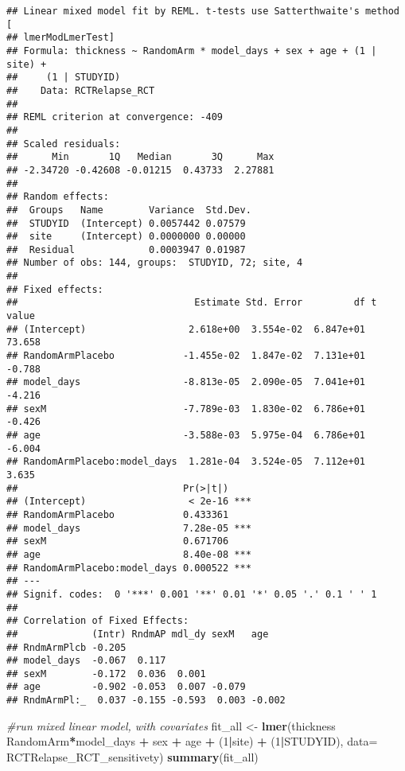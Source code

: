 \documentclass[]{article}
\newenvironment{Shaded}{\begin{snugshade}}{\end{snugshade}}
\newcommand{\KeywordTok}[1]{\textcolor[rgb]{0.13,0.29,0.53}{\textbf{#1}}}
\newcommand{\DataTypeTok}[1]{\textcolor[rgb]{0.13,0.29,0.53}{#1}}
\newcommand{\DecValTok}[1]{\textcolor[rgb]{0.00,0.00,0.81}{#1}}
\newcommand{\StringTok}[1]{\textcolor[rgb]{0.31,0.60,0.02}{#1}}
\newcommand{\CommentTok}[1]{\textcolor[rgb]{0.56,0.35,0.01}{\textit{#1}}}
\newcommand{\OperatorTok}[1]{\textcolor[rgb]{0.81,0.36,0.00}{\textbf{#1}}}
\newcommand{\NormalTok}[1]{#1}
\theoremstyle{definition}
\theoremstyle{definition}
\theoremstyle{definition}
\theoremstyle{remark}
\begin{document}
\begin{verbatim}
## Linear mixed model fit by REML. t-tests use Satterthwaite's method [
## lmerModLmerTest]
## Formula: thickness ~ RandomArm * model_days + sex + age + (1 | site) +  
##     (1 | STUDYID)
##    Data: RCTRelapse_RCT
## 
## REML criterion at convergence: -409
## 
## Scaled residuals: 
##      Min       1Q   Median       3Q      Max 
## -2.34720 -0.42608 -0.01215  0.43733  2.27881 
## 
## Random effects:
##  Groups   Name        Variance  Std.Dev.
##  STUDYID  (Intercept) 0.0057442 0.07579 
##  site     (Intercept) 0.0000000 0.00000 
##  Residual             0.0003947 0.01987 
## Number of obs: 144, groups:  STUDYID, 72; site, 4
## 
## Fixed effects:
##                               Estimate Std. Error         df t value
## (Intercept)                  2.618e+00  3.554e-02  6.847e+01  73.658
## RandomArmPlacebo            -1.455e-02  1.847e-02  7.131e+01  -0.788
## model_days                  -8.813e-05  2.090e-05  7.041e+01  -4.216
## sexM                        -7.789e-03  1.830e-02  6.786e+01  -0.426
## age                         -3.588e-03  5.975e-04  6.786e+01  -6.004
## RandomArmPlacebo:model_days  1.281e-04  3.524e-05  7.112e+01   3.635
##                             Pr(>|t|)    
## (Intercept)                  < 2e-16 ***
## RandomArmPlacebo            0.433361    
## model_days                  7.28e-05 ***
## sexM                        0.671706    
## age                         8.40e-08 ***
## RandomArmPlacebo:model_days 0.000522 ***
## ---
## Signif. codes:  0 '***' 0.001 '**' 0.01 '*' 0.05 '.' 0.1 ' ' 1
## 
## Correlation of Fixed Effects:
##             (Intr) RndmAP mdl_dy sexM   age   
## RndmArmPlcb -0.205                            
## model_days  -0.067  0.117                     
## sexM        -0.172  0.036  0.001              
## age         -0.902 -0.053  0.007 -0.079       
## RndmArmPl:_  0.037 -0.155 -0.593  0.003 -0.002
\end{verbatim}

\begin{Shaded}
\begin{Highlighting}[]
\CommentTok{#run mixed linear model, with covariates}
\NormalTok{  fit_all <-}\StringTok{ }\KeywordTok{lmer}\NormalTok{(thickness }\OperatorTok{~}\StringTok{ }\NormalTok{RandomArm}\OperatorTok{*}\NormalTok{model_days }\OperatorTok{+}\StringTok{ }\NormalTok{sex }\OperatorTok{+}\StringTok{ }\NormalTok{age }\OperatorTok{+}\StringTok{ }\NormalTok{(}\DecValTok{1}\OperatorTok{|}\NormalTok{site) }\OperatorTok{+}\StringTok{ }\NormalTok{(}\DecValTok{1}\OperatorTok{|}\NormalTok{STUDYID), }\DataTypeTok{data=}\NormalTok{ RCTRelapse_RCT_sensitivety)}
  \KeywordTok{summary}\NormalTok{(fit_all)  }
\end{Highlighting}
\end{Shaded}
\end{document}
